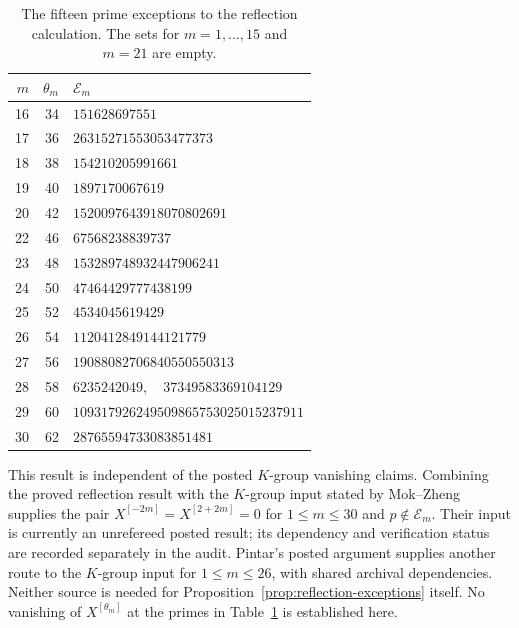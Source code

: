 \begin{table}[htbp]
\centering
\small
\begin{tabular}{rrl}
$m$ & $\theta_m$ & $\mathcal E_m$ \\
\hline
16&34&$151628697551$\\
17&36&$26315271553053477373$\\
18&38&$154210205991661$\\
19&40&$1897170067619$\\
20&42&$1520097643918070802691$\\
22&46&$67568238839737$\\
23&48&$153289748932447906241$\\
24&50&$47464429777438199$\\
25&52&$4534045619429$\\
26&54&$1120412849144121779$\\
27&56&$19088082706840550550313$\\
28&58&$6235242049,\quad37349583369104129$\\
29&60&$109317926249509865753025015237911$\\
30&62&$28765594733083851481$\\
\hline
\end{tabular}
\caption{The fifteen prime exceptions to the reflection calculation.
The sets for $m=1,\ldots,15$ and $m=21$ are empty.}
\label{tab:reflection-exceptions}
\end{table}

This result is independent of the posted $K$-group vanishing claims.
Combining the proved reflection result with the $K$-group input stated
by Mok--Zheng supplies the pair
$X^{[-2m]}=X^{[2+2m]}=0$ for $1\leq m\leq30$ and
$p\notin\mathcal E_m$. Their input is currently an unrefereed
posted result; its dependency and verification status are recorded
separately in the audit. Pintar's posted argument supplies another
route to the $K$-group input for $1\leq m\leq26$, with shared
archival dependencies. Neither source is needed for
Proposition~\ref{prop:reflection-exceptions} itself.
No vanishing of $X^{[\theta_m]}$ at the primes in
Table~\ref{tab:reflection-exceptions} is established here.

